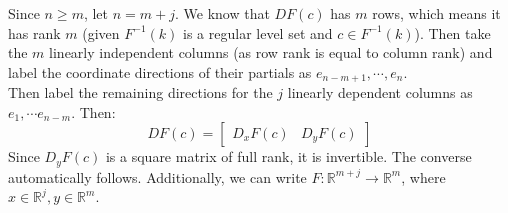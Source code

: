 \documentclass[10pt,letterpaper]{article} %
\begin{document}
Since $n \geqslant m$, let $n = m+j$. We know that $DF(c)$ has $m$ rows, which means it has rank $m$ (given $F^{-1}(k)$ is a regular level set and $c \in F^{-1}(k)$). Then take the $m$ linearly independent columns (as row rank is equal to column rank) and label the coordinate directions of their partials as $e_{n-m+1}, \cdots, e_n$.\\

Then label the remaining directions for the $j$ linearly dependent columns as $e_1, \cdots e_{n-m}$. Then:
\begin{equation*}
DF(c) = \begin{bmatrix}
D_xF(c) & D_yF(c)
\end{bmatrix}
\end{equation*}
Since $D_yF(c)$ is a square matrix of full rank, it is invertible. The converse automatically follows. Additionally, we can write $F: \mathbb{R}^{m+j} \xrightarrow{} \mathbb{R}^m$, where $x \in \mathbb{R}^j, y \in \mathbb{R}^m$. 
\end{document}
